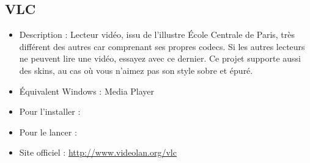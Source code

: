 \subsection{VLC}
\label{RefInstallVLC}
\begin{itemize}
\begingroup
{}
\item Description : Lecteur vidéo, issu de l'illustre École Centrale de Paris, très différent des autres car comprenant ses propres codecs. Si les autres lecteurs ne peuvent lire une vidéo, essayez avec ce dernier. Ce projet supporte aussi des skins, au cas où vous n'aimez pas son style sobre et épuré.{\par}
\item Équivalent Windows : Media Player{\par}
\item Pour l'installer : 
\item Pour le lancer : 
\item Site officiel : \url{http://www.videolan.org/vlc}{\par}
\endgroup
\end{itemize}
